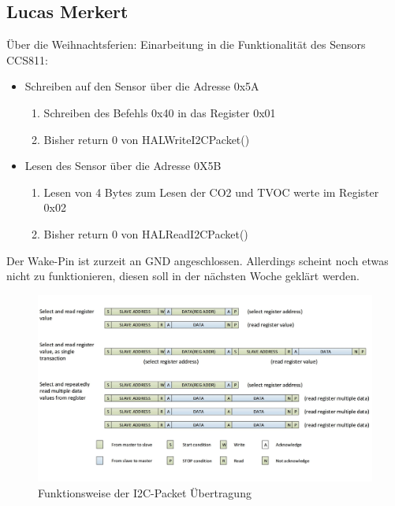 \documentclass[]{article}
\begin{document}
\subsection{Lucas Merkert}
Über die Weihnachtsferien: Einarbeitung in die Funktionalität des Sensors CCS811:
\begin{itemize}
	\item Schreiben auf den Sensor über die Adresse 0x5A
	\begin{enumerate}
		\item Schreiben des Befehls 0x40 in das Register 0x01
		\item Bisher return 0 von HALWriteI2CPacket()
	\end{enumerate}
	\item Lesen des Sensor über die Adresse 0X5B
		\begin{enumerate}
			\item Lesen von 4 Bytes zum Lesen der CO2 und TVOC werte im Register 0x02
			\item Bisher return 0 von HALReadI2CPacket()
		\end{enumerate}
	\end{itemize}

Der Wake-Pin ist zurzeit an GND angeschlossen. Allerdings scheint noch etwas nicht zu funktionieren, diesen soll in der nächsten Woche geklärt werden. 
\begin{figure}[h]
	\centering
	\includegraphics[scale=0.30]{images/i2c_ccs811}
	\caption{Funktionsweise der I2C-Packet Übertragung\cite{datasheetcss811}}
	\label{img:I2C_ccs811}
\end{figure}
\end{document}
